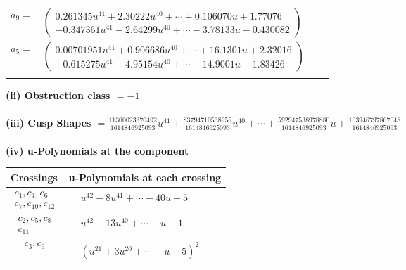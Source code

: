 \documentclass[1p]{elsarticle_modified}
\theoremstyle{definition}
\begin{document}
\begin{tabular}{m{7pt} m{180pt} m{7pt} m{180pt} }
\flushright $a_{9}=$&$\begin{pmatrix}0.261345 u^{41}+2.30222 u^{40}+\cdots+0.106070 u+1.77076\\-0.347361 u^{41}-2.64299 u^{40}+\cdots-3.78133 u-0.430082\end{pmatrix}$ \\
\flushright $a_{5}=$&$\begin{pmatrix}0.00701951 u^{41}+0.906686 u^{40}+\cdots+16.1301 u+2.32016\\-0.615275 u^{41}-4.95154 u^{40}+\cdots-14.9001 u-1.83426\end{pmatrix}$\\&\end{tabular}
\flushleft \textbf{(ii) Obstruction class $= -1$}\\~\\
\flushleft \textbf{(iii) Cusp Shapes $= \frac{11300023370492}{1614846925093} u^{41}+\frac{83794710538956}{1614846925093} u^{40}+\cdots+\frac{592947538978880}{1614846925093} u+\frac{103946797867048}{1614846925093}$}\\~\\
\newpage\renewcommand{\arraystretch}{1}
\flushleft \textbf{(iv) u-Polynomials at the component}\newline \\
\begin{tabular}{m{50pt}|m{274pt}}
Crossings & \hspace{64pt}u-Polynomials at each crossing \\
\hline $$\begin{aligned}c_{1},c_{4},c_{6}\\c_{7},c_{10},c_{12}\end{aligned}$$&$\begin{aligned}
&u^{42}-8 u^{41}+\cdots-40 u+5
\end{aligned}$\\
\hline $$\begin{aligned}c_{2},c_{5},c_{8}\\c_{11}\end{aligned}$$&$\begin{aligned}
&u^{42}-13 u^{40}+\cdots- u+1
\end{aligned}$\\
\hline $$\begin{aligned}c_{3},c_{9}\end{aligned}$$&$\begin{aligned}
&(u^{21}+3 u^{20}+\cdots- u-5)^{2}
\end{aligned}$\\
\hline
\end{tabular}\\~\\
\end{document}

